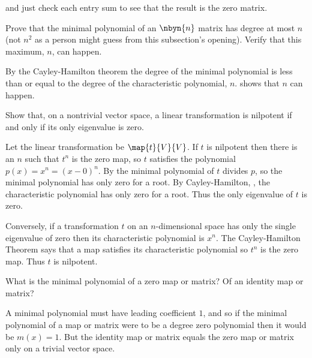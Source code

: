 \begin{exercises}
\begin{answer}
      and just check each entry sum to see that the result is the zero matrix.
    \end{answer}
  \recommended \item
    Prove that the minimal polynomial of an \( \nbyn{n} \) matrix has
    degree at most \( n \) (not \( n^2 \) as a person might guess from this
    subsection's opening).
    Verify that this maximum, \( n \), can happen.
    \begin{answer}
      By the Cayley-Hamilton theorem the degree of the minimal polynomial is
      less than or equal to the degree of the characteristic polynomial,
      \( n \).
       shows that \( n \) can happen.
    \end{answer}
   \recommended \item 
     Show that, on a nontrivial vector space, a linear transformation is 
     nilpotent if and only if its only eigenvalue is zero.
     \begin{answer}
       Let the linear transformation be $\map{t}{V}{V}$.
       If $t$ is nilpotent then there is an $n$ such that $t^n$ is the zero map,
       so $t$ satisfies the polynomial $p(x)=x^n=(x-0)^n$.
       By  the minimal polynomial of 
       $t$ divides $p$, so the minimal polynomial has only zero for a root.
       By Cayley-Hamilton, ,
       the characteristic polynomial has only zero for a root.
       Thus the only eigenvalue of $t$ is zero.

       Conversely, if a transformation \( t \) on an
       \( n \)-dimensional space has only the single eigenvalue of zero 
       then its characteristic polynomial is \( x^n \). 
       The Cayley-Hamilton Theorem says that a map satisfies its
       characteristic polynomial so \( t^n \) is the zero map.
       Thus $t$ is nilpotent.
     \end{answer}
   \item 
       What is the minimal polynomial of a zero map or matrix?
       Of an identity map or matrix?
       \begin{answer}
         A minimal polynomial must have leading coefficient $1$, 
         and so if the minimal polynomial of a map or matrix were to 
         be a degree zero polynomial then it would be $m(x)=1$.
         But the identity map or matrix equals the zero map or matrix
         only on a trivial vector space.


\end{answer}
\end{exercises}
